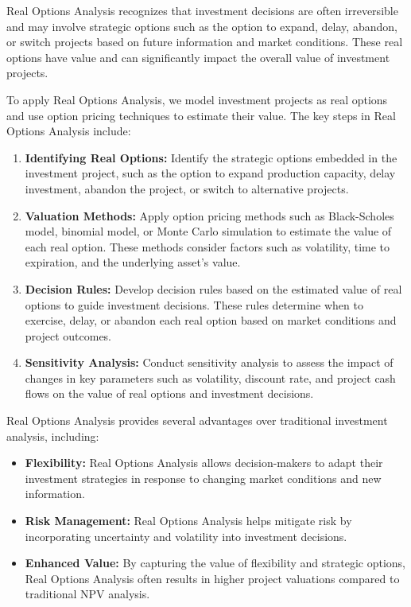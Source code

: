 \documentclass[12pt]{book} %
\begin{document}
Real Options Analysis recognizes that investment decisions are often irreversible and may involve strategic options such as the option to expand, delay, abandon, or switch projects based on future information and market conditions. These real options have value and can significantly impact the overall value of investment projects.

To apply Real Options Analysis, we model investment projects as real options and use option pricing techniques to estimate their value. The key steps in Real Options Analysis include:
\begin{enumerate}
    \item \textbf{Identifying Real Options:} Identify the strategic options embedded in the investment project, such as the option to expand production capacity, delay investment, abandon the project, or switch to alternative projects.
    \item \textbf{Valuation Methods:} Apply option pricing methods such as Black-Scholes model, binomial model, or Monte Carlo simulation to estimate the value of each real option. These methods consider factors such as volatility, time to expiration, and the underlying asset's value.
    \item \textbf{Decision Rules:} Develop decision rules based on the estimated value of real options to guide investment decisions. These rules determine when to exercise, delay, or abandon each real option based on market conditions and project outcomes.
    \item \textbf{Sensitivity Analysis:} Conduct sensitivity analysis to assess the impact of changes in key parameters such as volatility, discount rate, and project cash flows on the value of real options and investment decisions.
\end{enumerate}

Real Options Analysis provides several advantages over traditional investment analysis, including:
\begin{itemize}
    \item \textbf{Flexibility:} Real Options Analysis allows decision-makers to adapt their investment strategies in response to changing market conditions and new information.
    \item \textbf{Risk Management:} Real Options Analysis helps mitigate risk by incorporating uncertainty and volatility into investment decisions.
    \item \textbf{Enhanced Value:} By capturing the value of flexibility and strategic options, Real Options Analysis often results in higher project valuations compared to traditional NPV analysis.
\end{itemize}
\end{document}
